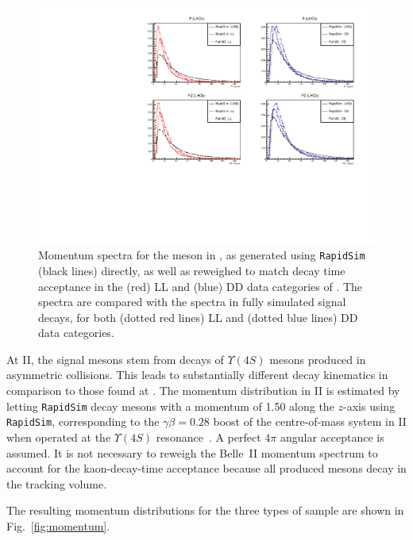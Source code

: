 \begin{figure}[tbp]
    \centering
    \includegraphics[width=0.8\columnwidth]{figures/ks_chapter/note_figs/lhcb_studies/RapidSim_P_comparison.pdf}
    \caption{Momentum spectra for the \KS meson in \lhcb, as generated using \texttt{RapidSim} (black lines) directly, as well as reweighed to match decay time acceptance in the (red) LL and (blue) DD data categories of \lhcb. The \lhcb spectra are compared with the spectra in fully simulated signal decays, for both (dotted red lines) LL and (dotted blue lines) DD data categories.}
    \label{fig:rapidsim_momentum_comparison}
\end{figure}

At \belle II, the signal \B mesons stem from decays of $\Upsilon(4S)$ mesons  produced in asymmetric  collisions. This leads to substantially different decay kinematics in comparison to those found at \lhcb. The momentum distribution in \belle II is estimated by letting \texttt{RapidSim} decay \B mesons with a momentum of 1.50 \gevc along the $z$-axis using \texttt{RapidSim}, corresponding to the $\gamma\beta=0.28$ boost of the centre-of-mass system in \belle II when operated at the $\Upsilon(4S)$ resonance~\cite{kouBelleIIPhysics2019}. A perfect $4\pi$ angular acceptance is assumed.   It is not necessary to reweigh the Belle~II momentum spectrum to account for the kaon-decay-time acceptance because all produced \KS mesons decay in the tracking volume. 

The resulting momentum distributions for the three types of sample are shown in Fig.~\ref{fig:momentum}.




